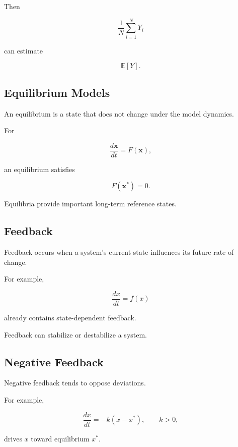 Then

\[
\boxed{
\frac1N
\sum_{i=1}^{N}Y_i
}
\]

can estimate

\[
\mathbb{E}[Y].
\]

\subsection{Equilibrium Models}
\label{subsec:model-equilibrium}

An equilibrium is a state that does not change under the model dynamics.

For

\[
\frac{d\mathbf{x}}{dt}
=
F(\mathbf{x}),
\]

an equilibrium satisfies

\[
\boxed{
F(\mathbf{x}^*)=0.
}
\]

Equilibria provide important long-term reference states.

\subsection{Feedback}
\label{subsec:model-feedback}

Feedback occurs when a system's current state influences its future rate of
change.

For example,

\[
\boxed{
\frac{dx}{dt}=f(x)
}
\]

already contains state-dependent feedback.

Feedback can stabilize or destabilize a system.

\subsection{Negative Feedback}
\label{subsec:negative-feedback}

Negative feedback tends to oppose deviations.

For example,

\[
\boxed{
\frac{dx}{dt}
=
-k(x-x^*),
\qquad
k>0,
}
\]

drives \(x\) toward equilibrium \(x^*\).

